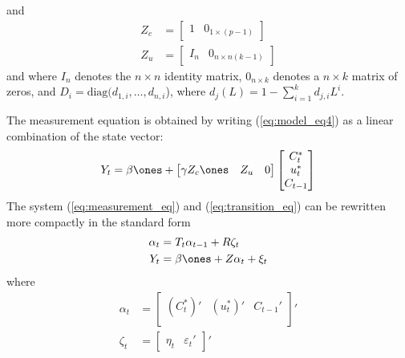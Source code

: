 and
\begin{equation}
	\begin{aligned}
		Z_c & = \begin{bmatrix}
			1 & 0_{1\times(p-1)}
		\end{bmatrix}\\
		Z_u & = \begin{bmatrix}
			I_n & 0_{n\times n (k-1)}
		\end{bmatrix}
	\end{aligned}
\end{equation}
and where $I_n$ denotes the $n\times n$ identity matrix, $0_{n\times k}$ denotes a $n\times k$ matrix of zeros, and $D_i = \text{diag}(d_{1,i}, \ldots, d_{n,i}$), where $d_j(L) = 1- \sum_{i=1}^k d_{j,i} L^i$.

The measurement equation is obtained by writing (\ref{eq:model_eq4}) as a linear combination of the state vector:
\begin{equation}\label{eq:measurement_eq}
	Y_t = \beta \ones + \begin{bmatrix}
		\gamma Z_c \ones & Z_u & 0 
	\end{bmatrix}
	\begin{bmatrix}
		C_t^\ast\\u_t^\ast \\ C_{t-1}
	\end{bmatrix}
\end{equation}
The system (\ref{eq:measurement_eq}) and (\ref{eq:transition_eq}) can be rewritten more compactly in the standard form
\begin{align}
	\alpha_t & = T_t \alpha_{t-1} + R\zeta_t \label{eq:alpha}\\
	Y_t & = \beta \ones + Z\alpha_t + \xi_t\label{eq:Y}
\end{align}
where
\begin{equation}
	\begin{aligned}
		\alpha_t &= \begin{bmatrix}
			(C_t^\ast)' & (u_t^\ast)' & C_{t-1}'\\
		\end{bmatrix}'\\
		\zeta_t & = \begin{bmatrix}
		\eta_t & \varepsilon_t'
	\end{bmatrix}'
	\end{aligned}
\end{equation}
